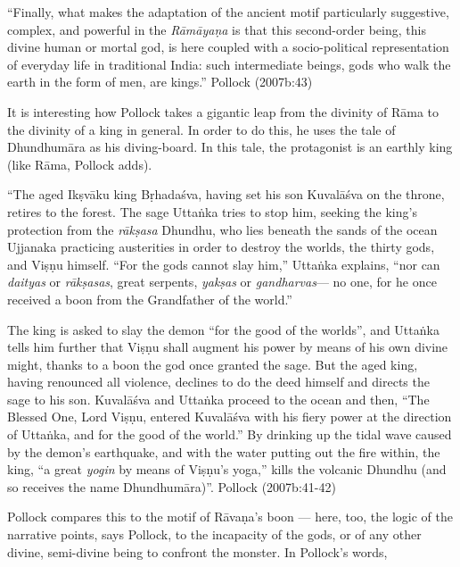 \begin{myquote}
“Finally, what makes the adaptation of the ancient motif particularly suggestive, complex, and powerful in the {\sl Rāmāyaṇa} is that this second-order being, this divine human or mortal god, is here coupled with a socio-political representation of everyday life in traditional India: such intermediate beings, gods who walk the earth in the form of men, are kings.”
\hfill  Pollock (2007b:43)
\end{myquote}

\newpage

It is interesting how Pollock takes a gigantic leap from the divinity of Rāma to the divinity of a king in general. In order to do this, he uses the tale of Dhundhumāra as his diving-board. In this tale, the protagonist is an earthly king (like Rāma, Pollock adds). 

\begin{myquote}
“The aged Ikṣvāku king Bṛhadaśva, having set his son Kuvalāśva on the throne, retires to the forest. The sage Uttaṅka tries to stop him, seeking the king’s protection from the {\sl rākṣasa} Dhundhu, who lies beneath the sands of the ocean Ujjanaka practicing austerities in order to destroy the worlds, the thirty gods, and Viṣṇu himself. “For the gods cannot slay him,” Uttaṅka explains, “nor can {\sl daityas} or {\sl rākṣasas}, great serpents, {\sl yakṣas} or {\sl gandharvas}--- no one, for he once received a boon from the  Grandfather of the world.”

The king is asked to slay the demon “for the good of the worlds”, and Uttaṅka tells him further that Viṣṇu shall augment his power by means of his own divine might, thanks to a boon the god once granted the sage. But the aged king, having renounced all violence, declines to do the deed himself and directs the sage to his son. Kuvalāśva and Uttaṅka proceed to the ocean and then, “The Blessed One, Lord Viṣṇu, entered Kuvalāśva with his fiery power at the direction of Uttaṅka, and for the good of the world.” By drinking up the tidal wave caused by the demon’s earthquake, and with the water putting out the fire within, the king, “a great {\sl yogin} by means of Viṣṇu’s yoga,” kills the volcanic Dhundhu (and so receives the name Dhundhumāra)”.
\hfill Pollock (2007b:41-42)
\end{myquote}

Pollock compares this to the motif of Rāvaṇa’s boon --- here, too, the logic of the narrative points, says Pollock, to the incapacity of the gods, or of any other divine, semi-divine being to confront the monster. In Pollock’s words,

